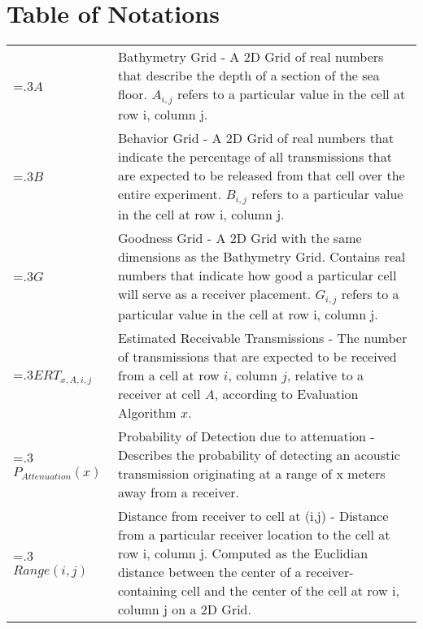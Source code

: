 
\chapter{Table of Notations}
\noindent\begin{tabularx}{\linewidth}{@{}>{\hsize=.3\hsize}X>{\hsize=1.5\hsize}X@{}}
	
	$A$ & Bathymetry Grid - A 2D Grid of real numbers that describe the depth of a section of the sea floor.  $A_{i,j}$ refers to a particular value in the cell at row i, column j.\\

	$B$ & Behavior Grid - A 2D Grid of real numbers that indicate the percentage of all transmissions that are expected to be released from that cell over the entire experiment.  $B_{i,j}$ refers to a particular value in the cell at row i, column j.\\
	
	$G$ & Goodness Grid - A 2D Grid with the same dimensions as the Bathymetry Grid.  Contains real numbers that indicate how good a particular cell will serve as a receiver placement.  $G_{i,j}$ refers to a particular value in the cell at row i, column j.\\

	$ERT_{x,A,i,j}$ & Estimated Receivable Transmissions - The number of transmissions that are expected to be received from a cell at row $i$, column $j$, relative to a receiver at cell $A$, according to Evaluation Algorithm $x$.\\

	$P_{Attenuation}(x)$ & Probability of Detection due to attenuation - Describes the probability of detecting an acoustic transmission originating at a range of x meters away from a receiver.\\
	
	$Range(i,j)$ & Distance from receiver to cell at (i,j) - Distance from a particular receiver location to the cell at row i, column j.  Computed as the Euclidian distance between the center of a receiver-containing cell and the center of the cell at row i, column j on a 2D Grid.\\
	

\end{tabularx}
